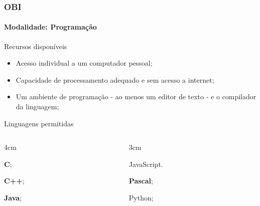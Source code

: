 \begin{frame}
	\frametitle{OBI}
	\framesubtitle{Modalidade: Programação}

	\begin{block:fact}{Recursos disponíveis}
		\begin{itemize}
			\item Acesso individual a um computador pessoal;
			\item Capacidade de processamento adequado e sem acesso a internet;
			\item Um ambiente de programação - ao menos um editor de texto - e o compilador da linguagem;
		\end{itemize}
	\end{block:fact}
	
	\begin{block:fact}{Linguagens permitidas}
		\begin{itemize}
			\begin{columns}[T]
			\end{columns}
		\end{itemize}
	\end{block:fact}

	\hfill
\end{frame}
